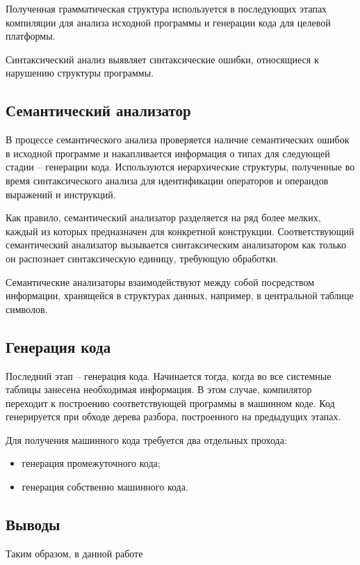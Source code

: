 Полученная грамматическая структура используется в последующих этапах компиляции для анализа исходной программы и генерации кода для целевой платформы. 

Синтаксический анализ выявляет синтаксические ошибки, относящиеся к нарушению структуры программы. \\

\subsection{Семантический анализатор}
В процессе семантического анализа проверяется наличие семантических ошибок в исходной программе и накапливается информация о типах для следующей стадии -- генерации кода. Используются иерархические структуры, полученные во время синтаксического анализа для идентификации операторов и операндов выражений и инструкций. 

Как правило, семантический анализатор разделяется на ряд более мелких, каждый из которых предназначен для конкретной конструкции. Соответствующий семантический анализатор вызывается синтаксическим анализатором как только он распознает синтаксическую единицу, требующую обработки.

Семантические анализаторы взаимодействуют между собой посредством информации, хранящейся в структурах данных, например, в центральной таблице символов. \\

\subsection{Генерация кода}
Последний этап -- генерация кода. Начинается тогда, когда во все системные таблицы занесена необходимая информация. В этом случае, компилятор переходит к построению соответствующей программы в машинном коде. Код генерируется при обходе дерева разбора, построенного на предыдущих этапах. 

Для получения машинного кода требуется два отдельных прохода:
\begin{itemize}
	\item генерация промежуточного кода;
	
	\item генерация собственно машинного кода.
\end{itemize}




\subsection*{Выводы}
Таким образом, в данной работе 
\pagebreak